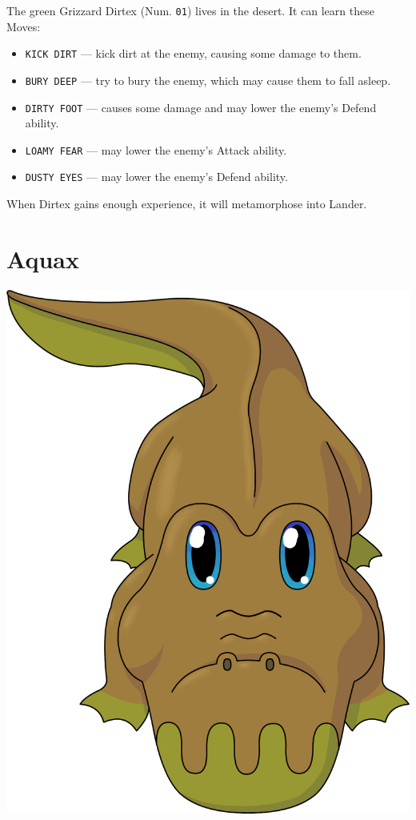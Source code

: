 \documentclass[10pt,twocolumn,openany,article]{memoir}
\newenvironment{ritemize}{\begin{itemize}\raggedright}{\end{itemize}}
\begin{document}
The green Grizzard Dirtex (Num. \texttt{01}) lives in the desert. It can
learn these Moves:

\begin{ritemize}
\item \texttt{KICK DIRT} --- kick dirt at the enemy, causing some damage
  to them.
\item \texttt{BURY DEEP} --- try to bury the enemy, which may cause them
  to fall asleep.
\item  \texttt{DIRTY FOOT}  --- causes  some  damage and  may lower  the
  enemy's Defend ability.
\item \texttt{LOAMY FEAR} --- may lower the enemy's Attack ability.
\item \texttt{DUSTY EYES} --- may lower the enemy's Defend ability.
\end{ritemize}

When Dirtex gains enough experience, it will metamorphose into Lander.

\fi

\section{Aquax}

\begin{center}
  \includegraphics[width=.75\columnwidth]{../Manual/Aquax.png}
\end{center}
\end{document}

